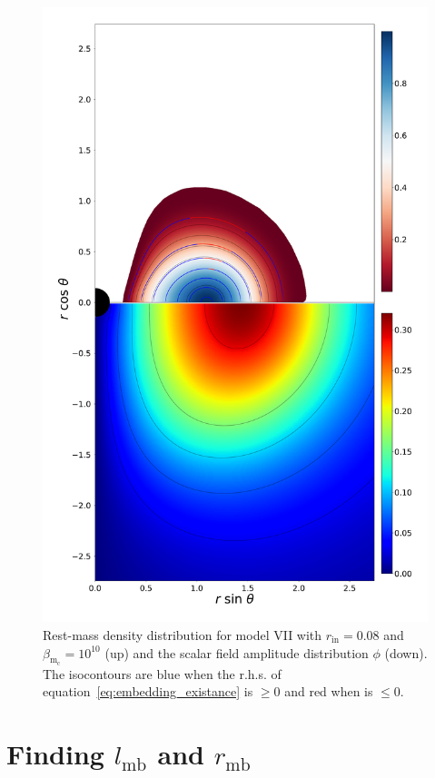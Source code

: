 \documentclass[twocolumn,aps,showpacs,showkeys,prd,superscriptaddress,byrevtex, amsmath]{revtex4-1}
\begin{document}
\begin{appendix}
\begin{figure}
\centering
\includegraphics[scale=0.2]{figures/embedding.pdf}
\hspace{0.5cm}
\caption{Rest-mass density distribution for model VII with $r_{\mathrm{in}} = 0.08$ and $\beta_{\mathrm{m_c}} = 10^{10}$ (up) and the scalar field amplitude distribution $\phi$ (down). The isocontours are blue when the r.h.s. of equation~\eqref{eq:embedding_existance} is $\geq 0$ and red when is $\leq 0$.}
\label{embedding_VII}
\end{figure}

\section{Finding $l_{\mathrm{mb}}$ and $r_{\mathrm{mb}}$}\label{ang_mom_appendix}
\end{appendix}     
\end{document}
